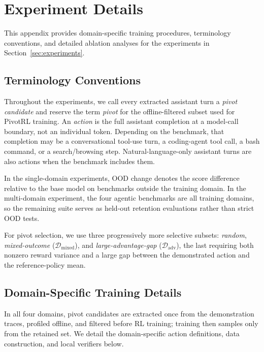 \section{Experiment Details}
\label{app:experiment_details}

This appendix provides domain-specific training procedures, terminology conventions, and detailed ablation analyses for the experiments in Section~\ref{sec:experiments}.

\subsection{Terminology Conventions}
\label{app:terminology}

Throughout the experiments, we call every extracted assistant turn a \emph{pivot candidate} and reserve the term \emph{pivot} for the offline-filtered subset used for PivotRL training. An \emph{action} is the full assistant completion at a model-call boundary, not an individual token. Depending on the benchmark, that completion may be a conversational tool-use turn, a coding-agent tool call, a bash command, or a search/browsing step. Natural-language-only assistant turns are also actions when the benchmark includes them.

In the single-domain experiments, OOD change denotes the score difference relative to the base model on benchmarks outside the training domain. In the multi-domain experiment, the four agentic benchmarks are all training domains, so the remaining suite serves as held-out retention evaluations rather than strict OOD tests.

For pivot selection, we use three progressively more selective subsets: \emph{random}, \emph{mixed-outcome} ($\mathcal{D}_{\mathrm{mixed}}$), and \emph{large-advantage-gap} ($\mathcal{D}_{\mathrm{adv}}$), the last requiring both nonzero reward variance and a large gap between the demonstrated action and the reference-policy mean.

\subsection{Domain-Specific Training Details}
\label{app:training_details}

In all four domains, pivot candidates are extracted once from the demonstration traces, profiled offline, and filtered before RL training; training then samples only from the retained set. We detail the domain-specific action definitions, data construction, and local verifiers below.

